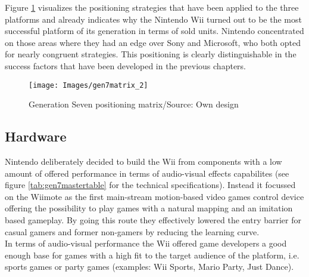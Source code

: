\documentclass
[
    a4paper,
    11pt
]
{article}
\begin{document}
Figure \ref{fig:gen7matrix} visualizes the positioning strategies that have been
applied to the three platforms and already indicates why the Nintendo Wii
turned out to be the most successful platform of its generation in terms of
sold units. Nintendo concentrated on those areas where they had an edge
over Sony and Microsoft, who both opted for nearly congruent strategies. This positioning
is clearly distinguishable in the success factors that have been developed
in the previous chapters.

\begin{figure}[ht!]
\centering
    \texttt{[image: Images/gen7matrix\_2]}
    \caption{Generation Seven positioning matrix/Source: Own design}
    \label{fig:gen7matrix}
\end{figure}
%
\subsection{Hardware}
\label{application-hardware}
Nintendo deliberately decided to build the Wii from components with a low amount
of offered performance in terms of audio-visual effects capabilites (see figure \ref{tab:gen7mastertable}
for the technical specifications). Instead it focussed on the Wiimote as the first main-stream motion-based video games
control device offering the possibility to play games with a natural
mapping and an imitation based gameplay. \cite{Casey2006} By going this route
they effectively lowered the entry barrier for casual gamers and former non-gamers
by reducing the learning curve. \\
In terms of audio-visual performance the Wii offered game developers a good enough
base for games with a high fit to the target audience of the platform, i.e.
sports games or party games (examples: Wii Sports, Mario Party, Just Dance).
\end{document}
